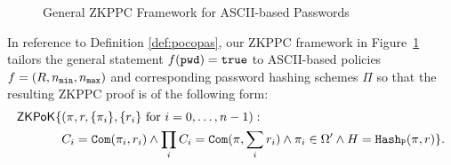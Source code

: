 \begin{figure}[t]
\caption{General ZKPPC Framework for ASCII-based Passwords}
\label{fig:zkpconeserver}
\end{figure}

\noindent
In reference to Definition \ref{def:pocopas}, our ZKPPC framework in Figure~\ref{fig:zkpconeserver} tailors the general statement $f(\mathtt{pwd})=\mathtt{true}$ to ASCII-based policies $f=(R,{n_\mathtt{min}},{n_\mathtt{max}})$ and corresponding password hashing schemes $\Pi$ so that the resulting ZKPPC proof is of the following form:
\begin{align*}
\mathsf{ZKPoK}\{&(\pi,r,\{\pi_i\},\{r_i\}\textrm{ for }i=0,\ldots,n-1):\\
& C_i=\mathtt{Com}(\pi_i, r_i) \wedge \prod_iC_i=\mathtt{Com}(\pi, \sum_ir_i) \wedge \pi_i\in\Omega' \wedge H=\mathtt{Hash_P}(\pi,r)\}.
\end{align*}

